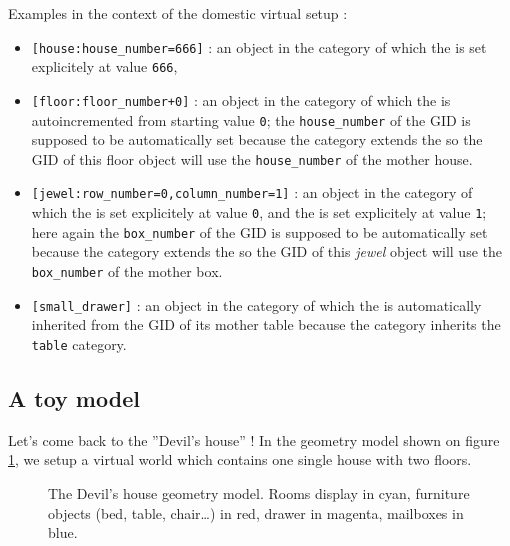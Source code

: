 \pn Examples in the context of the domestic virtual setup :
\begin{itemize}

\item \texttt{[house:house\_number=666]} : an object in the 
  category of which the  is set explicitely at value
  \texttt{666},

\item \texttt{[floor:floor\_number+0]}  : an object  in the 
  category  of which  the   is  autoincremented from
  starting value \texttt{0}; the  \texttt{house\_number} of the GID is
  supposed  to be  automatically set  because the   category
  extends the  so the GID  of this floor object will use the
  \texttt{house\_number} of the mother house.

\item  \texttt{[jewel:row\_number=0,column\_number=1]} : an  object in
  the    category  of  which  the    is  set
  explicitely at value \texttt{0},  and the  is set
  explicitely at value \texttt{1}; here again the \texttt{box\_number}
  of  the  GID  is  supposed  to  be  automatically  set  because  the
   category extends the  so the GID of this
  \emph{jewel} object will use  the \texttt{box\_number} of the mother
  box.

\item \texttt{[small\_drawer]}  : an object  in the 
  category of which  the  is automatically inherited
  from  the GID  of its  mother table  because  the 
  category inherits the \texttt{table} category.

\end{itemize}

\clearpage
\subsection{A toy model}\label{ssec:toy_model}

Let's  come back to  the ''Devil's  house'' !   In the  geometry model
shown on  figure \ref{fig:mapping:0}, we  setup a virtual  world which
contains one single house with two floors.

\begin{figure}[h]
\begin{center}
\end{center}
\caption{The  Devil's house  geometry  model. Rooms  display in  cyan,
  furniture  objects  (bed,  table,  chair\dots)  in  red,  drawer  in
  magenta, mailboxes in blue.}\label{fig:mapping:0}
\end{figure}

